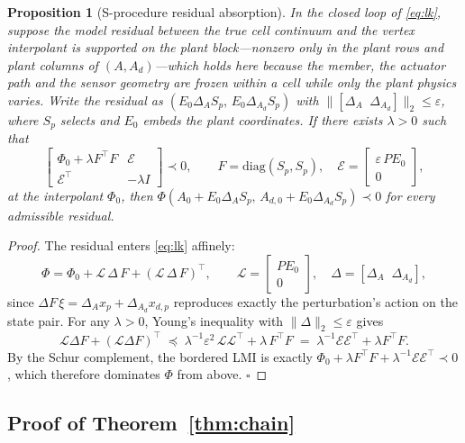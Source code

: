 \documentclass[preprint,12pt]{elsarticle}
\newtheorem{proposition}{Proposition}
\begin{document}
\begin{proposition}[S-procedure residual absorption]
\label{lem:sproc}
In the closed loop of \eqref{eq:lk}, suppose the model residual
between the true cell continuum and the vertex interpolant is
supported on the \emph{plant block}---nonzero only in the plant rows
and plant columns of $(A, A_d)$---which holds here because the member,
the actuator path and the sensor geometry are frozen within a cell
while only the plant physics varies.  Write the residual as
$(E_0 \Delta_A S_p,\, E_0 \Delta_{A_d} S_p)$ with
$\big\| [\Delta_A \;\; \Delta_{A_d}] \big\|_2 \le \varepsilon$, where
$S_p$ selects and $E_0$ embeds the plant coordinates.  If there exists
$\lambda > 0$ such that
\[
\begin{bmatrix}
\Phi_0 + \lambda F^{\!\top} F & \mathcal{E} \\
\mathcal{E}^{\!\top} & -\lambda I
\end{bmatrix} \prec 0,
\qquad
F = \mathrm{diag}(S_p, S_p), \quad
\mathcal{E} = \begin{bmatrix} \varepsilon\, P E_0 \\ 0 \end{bmatrix},
\]
at the interpolant $\Phi_0$, then
$\Phi(A_0 + E_0\Delta_A S_p,\, A_{d,0} + E_0\Delta_{A_d} S_p) \prec 0$
for every admissible residual.
\end{proposition}

\begin{proof}
The residual enters \eqref{eq:lk} affinely:
\[
\Phi = \Phi_0 + \mathcal{L}\, \Delta\, F + (\mathcal{L}\,\Delta\,
F)^{\!\top}, \qquad
\mathcal{L} = \begin{bmatrix} P E_0 \\ 0 \end{bmatrix}, \quad
\Delta = [\Delta_A \;\; \Delta_{A_d}],
\]
since $\Delta F\, \xi = \Delta_A x_p + \Delta_{A_d} x_{d,p}$
reproduces exactly the perturbation's action on the state pair.  For
any $\lambda > 0$, Young's inequality with $\|\Delta\|_2 \le
\varepsilon$ gives
\[
\mathcal{L} \Delta F + (\mathcal{L}\Delta F)^{\!\top}
\;\preceq\;
\lambda^{-1} \varepsilon^{2}\, \mathcal{L}\mathcal{L}^{\!\top}
+ \lambda\, F^{\!\top} F
\;=\;
\lambda^{-1} \mathcal{E}\mathcal{E}^{\!\top} + \lambda F^{\!\top} F .
\]
By the Schur complement, the bordered LMI is exactly
$\Phi_0 + \lambda F^{\!\top}F + \lambda^{-1}
\mathcal{E}\mathcal{E}^{\!\top} \prec 0$, which therefore dominates
$\Phi$ from above. \hfill$\square$
\end{proof}

\subsection{Proof of Theorem~\ref{thm:chain}}
\end{document}
